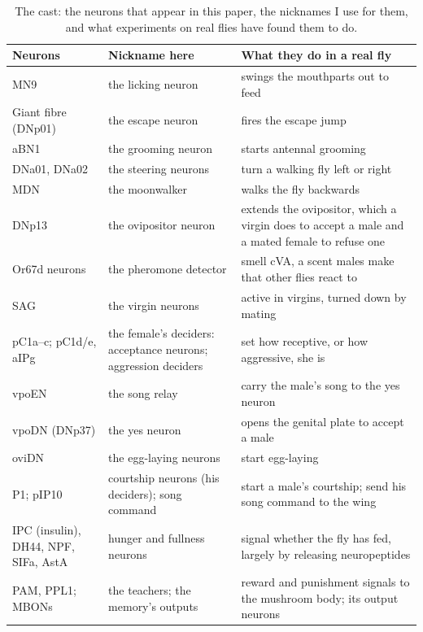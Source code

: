 \begin{table}[tbp]
\centering
\small
\renewcommand{\arraystretch}{1.1}
\begin{tabularx}{\textwidth}{@{}>{\RaggedRight}p{3.3cm}>{\RaggedRight}p{3.2cm}>{\RaggedRight\arraybackslash}X@{}}
\toprule
\textbf{Neurons} & \textbf{Nickname here} & \textbf{What they do in a real fly} \\
\midrule
MN9 & the licking neuron & swings the mouthparts out to feed \citep{shiu2024drosophila} \\
Giant fibre (DNp01) & the escape neuron & fires the escape jump \citep{vonreyn2014spike} \\
aBN1 & the grooming neuron & starts antennal grooming \citep{hampel2015neural} \\
DNa01, DNa02 & the steering neurons & turn a walking fly left or right \citep{rayshubskiy2025neural} \\
MDN & the moonwalker & walks the fly backwards \citep{bidaye2014neuronal} \\
DNp13 & the ovipositor neuron & extends the ovipositor, which a virgin does to accept a male and a mated female to refuse one \citep{mezzera2020ovipositor} \\
Or67d neurons & the pheromone detector & smell cVA, a scent males make that other flies react to \citep{kurtovic2007single} \\
SAG & the virgin neurons & active in virgins, turned down by mating \citep{feng2014ascending} \\
pC1a--c; pC1d/e, aIPg & the female's deciders: acceptance neurons; aggression deciders & set how receptive, or how aggressive, she is \citep{wang2021neural,deutsch2020neural,schretter2020cell} \\
vpoEN & the song relay & carry the male's song to the yes neuron \citep{wang2021neural} \\
vpoDN (DNp37) & the yes neuron & opens the genital plate to accept a male \citep{wang2021neural} \\
oviDN & the egg-laying neurons & start egg-laying \citep{wang2020neural} \\
P1; pIP10 & courtship neurons (his deciders); song command & start a male's courtship; send his song command to the wing \citep{vonphilipsborn2011neuronal,kohatsu2011female} \\
IPC (insulin), DH44, NPF, SIFa, AstA & hunger and fullness neurons & signal whether the fly has fed, largely by releasing neuropeptides \citep{pool2014feeding} \\
PAM, PPL1; MBONs & the teachers; the memory's outputs & reward and punishment signals to the mushroom body; its output neurons \citep{aso2014neuronal} \\
\bottomrule
\end{tabularx}
\caption{The cast: the neurons that appear in this paper, the nicknames I use for them, and what experiments on real flies have found them to do.}
\label{tab:cast}
\end{table}

